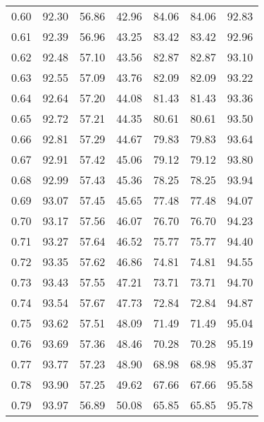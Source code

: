 \begin{tabular}{|c|c|c|c|c|c|c|}
      0.60 &     92.30 &     56.86 &      42.96 &   84.06 &      84.06 &         92.83 \\
      0.61 &     92.39 &     56.96 &      43.25 &   83.42 &      83.42 &         92.96 \\
      0.62 &     92.48 &     57.10 &      43.56 &   82.87 &      82.87 &         93.10 \\
      0.63 &     92.55 &     57.09 &      43.76 &   82.09 &      82.09 &         93.22 \\
      0.64 &     92.64 &     57.20 &      44.08 &   81.43 &      81.43 &         93.36 \\
      0.65 &     92.72 &     57.21 &      44.35 &   80.61 &      80.61 &         93.50 \\
      0.66 &     92.81 &     57.29 &      44.67 &   79.83 &      79.83 &         93.64 \\
      0.67 &     92.91 &     57.42 &      45.06 &   79.12 &      79.12 &         93.80 \\
      0.68 &     92.99 &     57.43 &      45.36 &   78.25 &      78.25 &         93.94 \\
      0.69 &     93.07 &     57.45 &      45.65 &   77.48 &      77.48 &         94.07 \\
      0.70 &     93.17 &     57.56 &      46.07 &   76.70 &      76.70 &         94.23 \\
      0.71 &     93.27 &     57.64 &      46.52 &   75.77 &      75.77 &         94.40 \\
      0.72 &     93.35 &     57.62 &      46.86 &   74.81 &      74.81 &         94.55 \\
      0.73 &     93.43 &     57.55 &      47.21 &   73.71 &      73.71 &         94.70 \\
      0.74 &     93.54 &     57.67 &      47.73 &   72.84 &      72.84 &         94.87 \\
      0.75 &     93.62 &     57.51 &      48.09 &   71.49 &      71.49 &         95.04 \\
      0.76 &     93.69 &     57.36 &      48.46 &   70.28 &      70.28 &         95.19 \\
      0.77 &     93.77 &     57.23 &      48.90 &   68.98 &      68.98 &         95.37 \\
      0.78 &     93.90 &     57.25 &      49.62 &   67.66 &      67.66 &         95.58 \\
      0.79 &     93.97 &     56.89 &      50.08 &   65.85 &      65.85 &         95.78 \\

\end{tabular}
